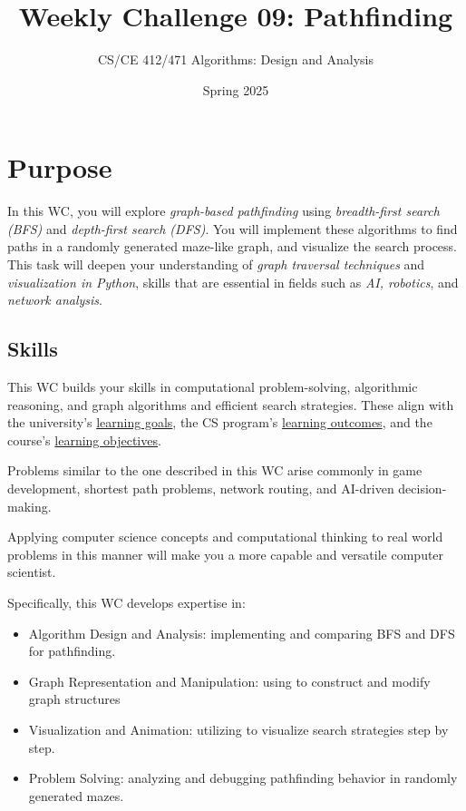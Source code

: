 \documentclass[a4paper]{exam}
\title{Weekly Challenge 09: Pathfinding}
\author{CS/CE 412/471 Algorithms: Design and Analysis}
\date{Spring 2025}
\begin{document}
\maketitle
\thispagestyle{empty}

\section*{Purpose}

In this WC, you will explore \textit{graph-based pathfinding} using \textit{breadth-first search (BFS)} and \textit{depth-first search (DFS)}. You will implement these algorithms to find paths in a randomly generated maze-like graph, and visualize the search process. This task will deepen your understanding of \textit{graph traversal techniques} and \textit{visualization in Python}, skills that are essential in fields such as \textit{AI, robotics}, and \textit{network analysis}.

\subsection*{Skills}

This WC builds your skills in computational problem-solving, algorithmic reasoning, and graph algorithms and efficient search strategies. These align with the university's  \href{https://habib.edu.pk/about-us/vision-values/}{learning goals}, the CS program's \href{https://habib.edu.pk/academics/sse/computer-science/}{learning outcomes}, and the course's \href{https://hulms.instructure.com/courses/4297/outcomes}{learning objectives}.

Problems similar to the one described in this WC arise commonly in game development, shortest path problems, network routing, and AI-driven decision-making.

Applying computer science concepts and computational thinking to real world problems in this manner will make you a more capable and versatile computer scientist.

Specifically, this WC develops expertise in:
\begin{itemize}
\item Algorithm Design and Analysis: implementing and comparing BFS and DFS for pathfinding.
\item Graph Representation and Manipulation: using  to construct and modify graph structures
\item Visualization and Animation: utilizing  to visualize search strategies step by step.
\item Problem Solving: analyzing and debugging pathfinding behavior in randomly generated mazes.
\end{itemize}
\end{document}
